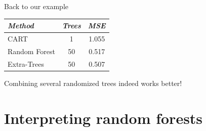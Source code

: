 \documentclass{beamer}
\begin{document}
\begin{frame}{Back to our example}

\begin{table}
    \centering
    \begin{tabular}{| l c c |}
    \hline
        \textit{Method} & \textit{Trees} & \textit{MSE}  \\
    \hline
    \hline
    CART & 1 & {\color{red}1.055} \\
    Random Forest & 50 & {\color{blue}0.517} \\
    Extra-Trees & 50 & {\color{blue}0.507} \\
    \hline
    \end{tabular}
\end{table}

\vspace{0.5cm}

\begin{center}
Combining several randomized trees indeed works better!
\end{center}

\end{frame}




\section{Interpreting random forests}
\end{document}
